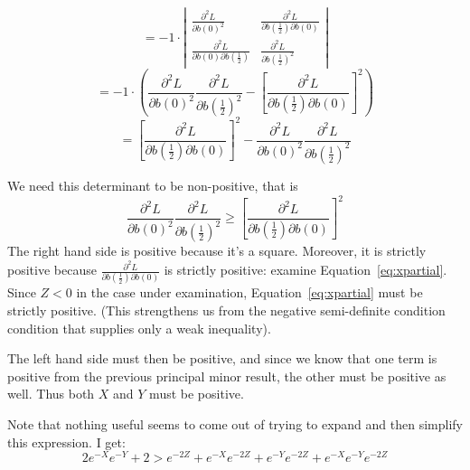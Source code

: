 \documentclass[12pt]{article}
\begin{document}
\begin{itemize}
\[		\]
		\[
		  = - 1 \cdot \left|\begin{array}{cc}
			\frac{\partial^2 L}{\partial b(0)^2} & \frac{\partial^2 L}{\partial b\left(\frac{1}{2}\right)\partial b\left(0\right)} \\
			\frac{\partial^2 L}{\partial b(0) \partial b\left(\frac{1}{2}\right)} & \frac{\partial^2 L}{\partial b\left(\frac{1}{2}\right)^2}
			\end{array} \right|
		\]
		\[
		  = - 1 \cdot \left(
			\frac{\partial^2 L}{\partial b(0)^2} \frac{\partial^2 L}{\partial b\left(\frac{1}{2}\right)^2} - \left[\frac{\partial^2 L}{\partial b\left(\frac{1}{2}\right)\partial b\left(0\right)}\right]^2 \right)
		\]
		\[
		  = \left[\frac{\partial^2 L}{\partial b\left(\frac{1}{2}\right)\partial b\left(0\right)}\right]^2 - \frac{\partial^2 L}{\partial b(0)^2} \frac{\partial^2 L}{\partial b\left(\frac{1}{2}\right)^2}
		\]

  We need this determinant to be non-positive, that is
		\[
		  \frac{\partial^2 L}{\partial b(0)^2} \frac{\partial^2 L}{\partial b\left(\frac{1}{2}\right)^2} \geq \left[\frac{\partial^2 L}{\partial b\left(\frac{1}{2}\right)\partial b\left(0\right)}\right]^2 
		\]
	  The right hand side is positive because it's a square. Moreover, it is strictly positive because $\frac{\partial^2 L}{\partial b\left(\frac{1}{2}\right)\partial b\left(0\right)}$ is strictly positive: examine Equation~\ref{eq:xpartial}. Since $Z < 0$ in the case under examination, Equation~\ref{eq:xpartial} must be strictly positive. (This strengthens us from the negative semi-definite condition condition that supplies only a weak inequality).
		
		The left hand side must then be positive, and since we know that one term is positive from the previous principal minor result, the other must be positive as well. Thus both $X$ and $Y$ must be positive.
\end{itemize}
Note that nothing useful seems to come out of trying to expand and then simplify this expression. I get:
\[
  2e^{-X}e^{-Y} + 2 > e^{-2Z} + e^{-X}e^{-2Z} + e^{-Y}e^{-2Z} + e^{-X}e^{-Y}e^{-2Z}
\]		
\end{document}
